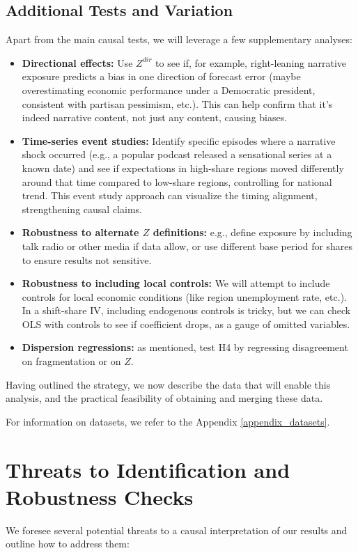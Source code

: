 \documentclass[12pt]{article}
\begin{document}
\subsection{Additional Tests and Variation}
Apart from the main causal tests, we will leverage a few supplementary analyses:

\begin{itemize}
    \item \textbf{Directional effects:} Use $Z^{dir}$ to see if, for example, right-leaning narrative exposure predicts a bias in one direction of forecast error (maybe overestimating economic performance under a Democratic president, consistent with partisan pessimism, etc.). This can help confirm that it's indeed narrative content, not just any content, causing biases.
    \item \textbf{Time-series event studies:} Identify specific episodes where a narrative shock occurred (e.g., a popular podcast released a sensational series at a known date) and see if expectations in high-share regions moved differently around that time compared to low-share regions, controlling for national trend. This event study approach can visualize the timing alignment, strengthening causal claims.
    \item \textbf{Robustness to alternate $Z$ definitions:} e.g., define exposure by including talk radio or other media if data allow, or use different base period for shares to ensure results not sensitive.
    \item \textbf{Robustness to including local controls:} We will attempt to include controls for local economic conditions (like region unemployment rate, etc.). In a shift-share IV, including endogenous controls is tricky, but we can check OLS with controls to see if coefficient drops, as a gauge of omitted variables.
    \item \textbf{Dispersion regressions:} as mentioned, test H4 by regressing disagreement on fragmentation or on $Z$.
\end{itemize}

Having outlined the strategy, we now describe the data that will enable this analysis, and the practical feasibility of obtaining and merging these data.

For information on datasets, we refer to the Appendix \ref{appendix_datasets}.

\section{Threats to Identification and Robustness Checks}
We foresee several potential threats to a causal interpretation of our results and outline how to address them:
\end{document}
